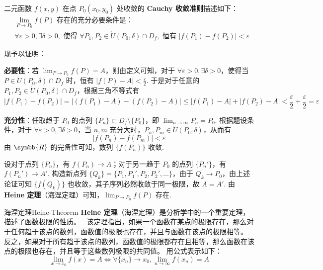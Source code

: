 \begin{myproof}
    二元函数 $f(x, y)$ 在点 $P_0(x_0, y_0)$ 处收敛的 \textbf{Cauchy 收敛准则}描述如下：
    \begin{equation}
        \boxed{
            \begin{aligned}
                 & \lim_{P \to P_0} f(P) \text{ 存在的充分必要条件是：}                                                                                                                     \\
                 & \forall \varepsilon > 0, \exists \delta > 0, \text{ 使得 } \forall P_1, P_2 \in \mathring{U}(P_0, \delta) \cap D_f, \text{ 恒有 } |f(P_1) - f(P_2)| < \varepsilon
            \end{aligned}
        }
    \end{equation}

    现予以证明：

    \textbf{必要性}：若 $\lim_{P \to P_0} f(P) = A$，则由定义可知，对于 $\forall \varepsilon > 0, \exists \delta > 0$，使得当 $P \in \mathring{U}(P_0, \delta) \cap D_f$ 时，恒有 $|f(P) - A| < \frac{\varepsilon}{2}$.
    于是对于任意的 $P_1, P_2 \in \mathring{U}(P_0, \delta) \cap D_f$，根据三角不等式有
    \begin{equation}
        |f(P_1) - f(P_2)| = |(f(P_1) - A) - (f(P_2) - A)| \le |f(P_1) - A| + |f(P_2) - A| < \frac{\varepsilon}{2} + \frac{\varepsilon}{2} = \varepsilon
    \end{equation}

    \textbf{充分性}：任取趋于 $P_0$ 的点列 $\{P_n\} \subset D_f \setminus \{P_0\}$，即 $\lim_{n \to \infty} P_n = P_0$.
    根据题设条件，对于 $\forall \varepsilon > 0, \exists \delta > 0$，当 $n, m$ 充分大时，$P_n, P_m \in \mathring{U}(P_0, \delta)$，从而有
    \begin{equation}
        |f(P_n) - f(P_m)| < \varepsilon
    \end{equation}
    由 $\symbb{R}$ 的完备性可知，数列 $\{f(P_n)\}$ 收敛.

    设对于点列 $\{P_n\}$，有 $f(P_n) \to A$；对于另一趋于 $P_0$ 的点列 $\{P_n'\}$，有 $f(P_n') \to A'$.
    构造新点列 $\{Q_k\} = \{P_1, P_1', P_2, P_2', \dots\}$，由于 $Q_k \to P_0$，由上述论证可知 $\{f(Q_k)\}$ 也收敛，其子序列必然收敛于同一极限，故 $A = A'$.
    由 \textbf{Heine 定理}（海涅定理）可知，$\lim_{P \to P_0} f(P)$ 存在.
\end{myproof}

\begin{note}{海涅定理}{Heine-Theorem}
    \textbf{Heine 定理}（海涅定理）是分析学中的一个重要定理，描述了函数极限的性质。{\emojifont 🤔😋}
    该定理指出，如果一个函数在某点的极限存在，那么对于任何趋于该点的数列，函数值的极限也存在，并且与函数在该点的极限相等。
    反之，如果对于所有趋于该点的数列，函数值的极限都存在且相等，那么函数在该点的极限也存在，并且等于这些数列极限的共同值。
    用公式表示如下：
    \begin{equation}
        \lim_{x \to x_0} f(x) = A \iff \forall \{x_n\} \to x_0, \lim_{n \to \infty} f(x_n) = A
    \end{equation}

\end{note}


